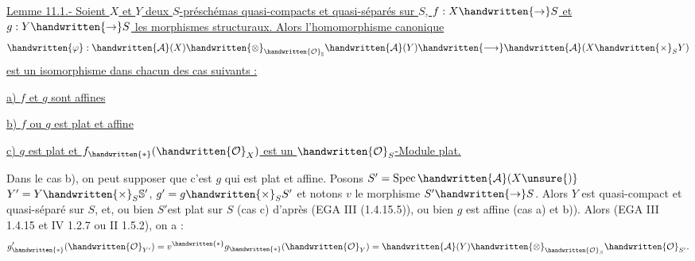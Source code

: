 \uline{Lemme 11.1.- Soient $X$ et $Y$ deux $S$-préschémas quasi-compacts et quasi-séparés sur $S$, $f:X\handwritten{\to}S$ et $g:Y\handwritten{\to}S$ les morphismes structuraux. Alors l'homomorphisme canonique}
\[
\handwritten{\varphi}:\handwritten{\mathcal{A}}(X)\handwritten{\otimes}_{\handwritten{\mathcal{O}}_{\mathbb{S}}}\handwritten{\mathcal{A}}(Y)\handwritten{\longrightarrow}\handwritten{\mathcal{A}}(X\handwritten{\times}_S Y)
\]
\uline{est un isomorphisme dans chacun des cas suivants :}

\uline{a) $f$ et $g$ sont affines}

\uline{b) $f$ ou $g$ est plat et affine}

\uline{c) $g$ est plat et $f_{\handwritten{*}}(\handwritten{\mathcal{O}}_X)$ est un $\handwritten{\mathcal{O}}_S$-Module plat.}

Dans le cas b), on peut supposer que c'est $g$ qui est plat et affine. Posons $S'=\operatorname{Spec}\handwritten{\mathcal{A}}(X\unsure{)}$ $Y'=Y\handwritten{\times}_S\mathbb{S}'$, $g'=g\handwritten{\times}_S S'$ et notons $v$ le morphisme $S'\handwritten{\to}S$. Alors $Y$ est quasi-compact et quasi-séparé sur $S$, et, ou bien $S'$est plat sur $S$ (cas c) d'après (EGA III (1.4.15.5)), ou bien $g$ est affine (cas a) et b)). Alors (EGA III 1.4.15 et IV 1.2.7 ou II 1.5.2), on a :
\[
g'_{\handwritten{*}}(\handwritten{\mathcal{O}}_{Y'})=v^{\handwritten{*}}g_{\handwritten{*}}(\handwritten{\mathcal{O}}_Y)=\handwritten{\mathcal{A}}(Y)\handwritten{\otimes}_{\handwritten{\mathcal{O}}_S}\handwritten{\mathcal{O}}_{S'}.
\]

